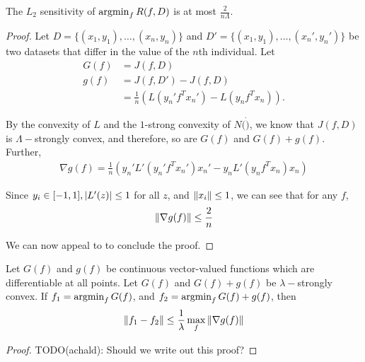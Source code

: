 \documentclass{article} %
\begin{document}
\begin{cor}
The $L_2$ sensitivity of $\operatorname*{argmin}_f R(f, D)$ is at most $\frac{2}{n \Lambda}$.
\label{cor:output_perturb_sensitivity}
\end{cor}
\begin{proof}
Let $D = \{(x_1, y_1), \dots, (x_n, y_n)\}$ and
$D' = \{(x_1, y_1), \dots, (x_n', y_n')\}$
be two datasets that differ in the value of the $n$th individual.
Let
\begin{align*}
G(f) &= J(f, D) \\
g(f) &= J(f, D') - J(f, D) \\
     &= \frac{1}{n} (L(y_n' f^T x_n') - L(y_n f^T x_n)).
\end{align*}

By the convexity of $L$ and the $1$-strong convexity of $N(\dot)$, we know that
$J(f, D)$ is $\Lambda-$strongly convex, and therefore, so are $G(f)$ and
$G(f) + g(f)$.
Further,
\begin{align*}
\nabla g(f)
= \frac{1}{n} \left(y_n' L'(y_n' f^T x_n') x_n' - y_n L'(y_n f^T x_n) x_n\right)
\end{align*}

Since $y_i \in [-1, 1], \left\lvert L'(z)\right\rvert \leq 1$ for all $z$, and
$\left\lVert x_i\right\rVert \leq 1$, we can see that for any $f$,
\begin{align*}
\left\lVert\nabla g(f)\right\rVert \leq \frac{2}{n}
\end{align*}

We can now appeal to  to conclude the
proof.
\end{proof}

\begin{lemma}
Let $G(f)$ and $g(f)$ be continuous vector-valued functions which are
differentiable at all points. Let $G(f)$ and $G(f) + g(f)$ be $\lambda-$strongly
convex. If $f_1 = \operatorname*{argmin}_f G(f)$, and $f_2 = \operatorname*{argmin}_f G(f) + g(f)$, then
\begin{align*}
\left\lVert f_1 - f_2\right\rVert \leq \frac{1}{\lambda} \max_f \left\lVert\nabla g(f)\right\rVert
\end{align*}
\label{lemma:strong_convex_sensitivity}
\end{lemma}

\begin{proof}
TODO(achald): Should we write out this proof?
\end{proof}
\end{document}
